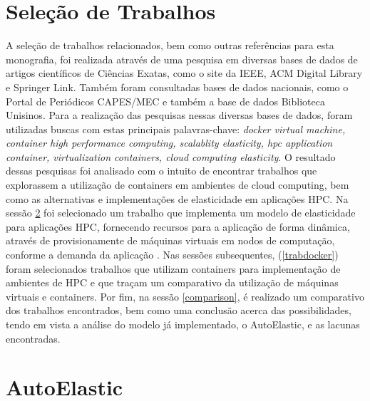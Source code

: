 \documentclass[twoside,english,brazilian]{UNISINOSmonografia}
\begin{document}
\section{Seleção de Trabalhos}

A seleção de trabalhos relacionados, bem como outras referências para esta monografia, foi realizada através de uma pesquisa em diversas bases de dados de artigos científicos de Ciências Exatas, como o site da IEEE, ACM Digital Library e Springer Link. Também foram consultadas bases de dados nacionais, como o Portal de Periódicos CAPES/MEC e também a base de dados Biblioteca Unisinos. 
Para a realização das pesquisas nessas diversas bases de dados, foram utilizadas buscas com estas principais palavras-chave: \textit{docker virtual machine, container high performance computing, scalablity elasticity, hpc application container, virtualization containers, cloud computing elasticity}. O resultado dessas pesquisas foi analisado com o intuito de encontrar trabalhos que explorassem a utilização de containers em ambientes de cloud computing, bem como as alternativas e implementações de elasticidade em aplicações HPC. Na sessão \ref{autoelastic} foi selecionado um trabalho que implementa um modelo de elasticidade para aplicações HPC, fornecendo recursos para a aplicação de forma dinâmica, através de provisionamente de máquinas virtuais em nodos de computação, conforme a demanda da aplicação \cite{7090978}. Nas sessões subsequentes, (\ref{trabdocker}) foram selecionados trabalhos que utilizam containers para implementação de ambientes de HPC e que traçam um comparativo da utilização de máquinas virtuais e containers. 
Por fim, na sessão \ref{comparison}, é realizado um comparativo dos trabalhos encontrados, bem como uma conclusão acerca das possibilidades, tendo em vista a análise do modelo já implementado, o AutoElastic, e as lacunas encontradas.

\section{AutoElastic}
\label{autoelastic}
\end{document}
